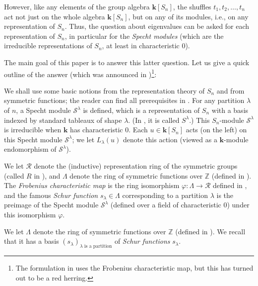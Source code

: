 \documentclass[numbers=enddot,12pt,final,onecolumn,notitlepage]{scrartcl}%
\theoremstyle{definition}
\newenvironment{noncompile}{}{}
\begin{document}
However, like any elements of the group algebra $\mathbf{k}\left[
S_{n}\right]  $, the shuffles $t_{1},t_{2},\ldots,t_{n}$ act not just on the
whole algebra $\mathbf{k}\left[  S_{n}\right]  $, but on any of its modules,
i.e., on any representation of $S_{n}$. Thus, the question about eigenvalues
can be asked for each representation of $S_{n}$, in particular for the
\emph{Specht modules} (which are the irreducible representations of $S_{n}$,
at least in characteristic $0$).

The main goal of this paper is to answer this latter question. Let us give a
quick outline of the answer (which was announced in \cite[\S 11]%
{fps2024sn})\footnote{The formulation in \cite[\S 11]{fps2024sn} uses the
Frobenius characteristic map, but this has turned out to be a red herring.}:

We shall use some basic notions from the representation theory of $S_{n}$ and
from symmetric functions; the reader can find all prerequisites in
\cite[Chapters 6 and 7]{Fulton97}. For any partition $\lambda$ of $n$, a
Specht module $\mathcal{S}^{\lambda}$ is defined, which is a representation of
$S_{n}$ with a basis indexed by standard tableaux of shape $\lambda$. (In
\cite{Fulton97}, it is called $S^{\lambda}$.) This $S_{n}$-module
$\mathcal{S}^{\lambda}$ is irreducible when $\mathbf{k}$ has characteristic
$0$. Each $u\in\mathbf{k}\left[  S_{n}\right]  $ acts (on the left) on this
Specht module $\mathcal{S}^{\lambda}$; we let $L_{\lambda}\left(  u\right)  $
denote this action (viewed as a $\mathbf{k}$-module endomorphism of
$\mathcal{S}^{\lambda}$).

\begin{noncompile}
We let $\mathcal{R}$ denote the (inductive) representation ring of the
symmetric groups (called $R$ in \cite[\S 7.3]{Fulton97}), and $\Lambda$ denote
the ring of symmetric functions over $\mathbb{Z}$ (defined in \cite[\S 6.2]%
{Fulton97}). The \emph{Frobenius characteristic map} is the ring isomorphism
$\varphi:\Lambda\rightarrow\mathcal{R}$ defined in \cite[\S 7.3]{Fulton97},
and the famous \emph{Schur function} $s_{\lambda}\in\Lambda$ corresponding to
a partition $\lambda$ is the preimage of the Specht module $\mathcal{S}%
^{\lambda}$ (defined over a field of characteristic $0$) under this
isomorphism $\varphi$.
\end{noncompile}

We let $\Lambda$ denote the ring of symmetric functions over $\mathbb{Z}$
(defined in \cite[\S 6.2]{Fulton97}). We recall that it has a basis $\left(
s_{\lambda}\right)  _{\lambda\text{ is a partition}}$ of \emph{Schur
functions} $s_{\lambda}$.
\end{document}
